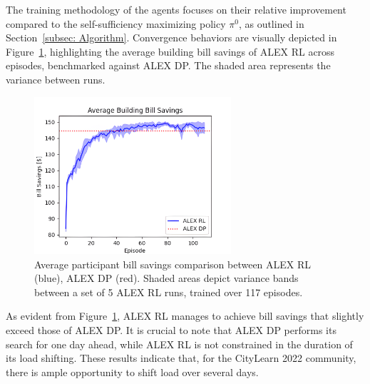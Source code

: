\documentclass[preprint, 12pt]{elsarticle}
\begin{document}
The training methodology of the agents focuses on their relative improvement compared to the self-sufficiency maximizing policy $\pi^{0}$, as outlined in Section~\ref{subsec: Algorithm}. Convergence behaviors are visually depicted in Figure~\ref{fig: Avg Building Return}, highlighting the average building bill savings of ALEX RL across episodes, benchmarked against ALEX DP. The shaded area represents the variance between runs.

\begin{figure}[h]
    \centering
    \includegraphics[width=0.65\textwidth]{Figures/AvgBillSavings_highres.png}
    \caption{Average participant bill savings comparison between ALEX RL (blue), ALEX DP (red). Shaded areas depict variance bands between a set of 5 ALEX RL runs, trained over 117 episodes.}
    \label{fig: Avg Building Return}
\end{figure}
As evident from Figure~\ref{fig: Avg Building Return}, ALEX RL manages to achieve bill savings that slightly exceed those of ALEX DP. It is crucial to note that ALEX DP performs its search for one day ahead, while ALEX RL is not constrained in the duration of its load shifting. These results indicate that, for the CityLearn 2022 community, there is ample opportunity to shift load over several days.
\end{document}

